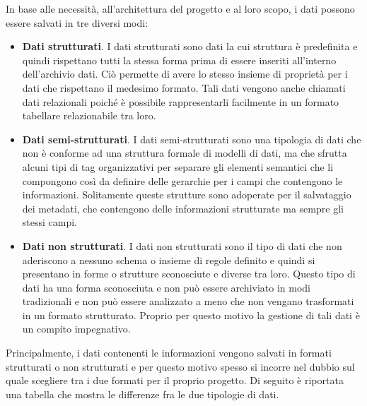 In base alle necessità, all’architettura del progetto e al loro scopo, i dati possono essere salvati in tre diversi modi:

\begin{itemize}
    \item \textbf{Dati strutturati}. I dati strutturati sono dati la cui struttura è predefinita e quindi rispettano tutti la stessa forma prima di essere inseriti all’interno dell’archivio dati. Ciò permette di avere lo stesso insieme di proprietà per i dati che rispettano il medesimo formato. Tali dati vengono anche chiamati dati relazionali poiché è possibile rappresentarli facilmente in un formato tabellare relazionabile tra loro.\cite{geeksforgeeks_big_data_structure}
    \item \textbf{Dati semi-strutturati}. I dati semi-strutturati sono una tipologia di dati che non è conforme ad una struttura formale di modelli di dati, ma che sfrutta alcuni tipi di tag organizzativi per separare gli elementi semantici che li compongono così da definire delle gerarchie per i campi che contengono le informazioni. Solitamente queste strutture sono adoperate per il salvataggio dei metadati, che contengono delle informazioni strutturate ma sempre gli stessi campi.\cite{magnimind_big_data_structure}
    \item \textbf{Dati non strutturati}. I dati non strutturati sono il tipo di dati che non aderiscono a nessuno schema o insieme di regole definito e quindi si presentano in forme o strutture sconosciute e diverse tra loro. Questo tipo di dati ha una forma sconosciuta e non può essere archiviato in modi tradizionali e non può essere analizzato a meno che non vengano trasformati in un formato strutturato. Proprio per questo motivo la gestione di tali dati è un compito impegnativo.\cite{altervista_big_data_structure}
\end{itemize}

Principalmente, i dati contenenti le informazioni vengono salvati in formati strutturati o non strutturati e per questo motivo spesso si incorre nel dubbio sul quale scegliere tra i due formati per il proprio progetto. Di seguito è riportata una tabella che mostra le differenze fra le due tipologie di dati.\cite{analytixlabs_big_data_structure}

